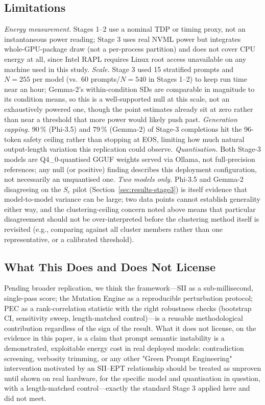 \documentclass[conference]{IEEEtran}
\begin{document}
\subsection{Limitations}
\label{sec:limits}
\emph{Energy measurement.} Stages 1--2 use a nominal TDP or timing
proxy, not an instantaneous power reading; Stage 3 uses real NVML
power but integrates whole-GPU-package draw (not a per-process
partition) and does not cover CPU energy at all, since Intel RAPL
requires Linux root access unavailable on any machine used in this
study. \emph{Scale.} Stage 3 used 15 stratified prompts and $N=255$
per model (vs.\ 60 prompts/$N=540$ in Stages 1--2) to keep run time
near an hour; Gemma-2's within-condition SDs are comparable in
magnitude to its condition means, so this is a well-supported null at
this scale, not an exhaustively powered one, though the point
estimates already sit at zero rather than near a threshold that more
power would likely push past. \emph{Generation capping.} 90\,\%
(Phi-3.5) and 79\,\% (Gemma-2) of Stage-3 completions hit the 96-token
safety ceiling rather than stopping at EOS, limiting how much natural
output-length variation this replication could observe.
\emph{Quantisation.} Both Stage-3 models are Q4\_0-quantised GGUF
weights served via Ollama, not full-precision references; any null (or
positive) finding describes this deployment configuration, not
necessarily an unquantised one. \emph{Two models only.} Phi-3.5 and
Gemma-2 disagreeing on the $S_c$ pilot (Section~\ref{sec:results-stage3})
is itself evidence that model-to-model variance can be large; two
data points cannot establish generality either way, and the
clustering-ceiling concern noted above means that particular
disagreement should not be over-interpreted before the clustering
method itself is revisited (e.g., comparing against all cluster
members rather than one representative, or a calibrated threshold).
\subsection{What This Does and Does Not License}
Pending broader replication, we think the framework---SII as a
sub-millisecond, single-pass score; the Mutation Engine as a
reproducible perturbation protocol; PEC as a rank-correlation
statistic with the right robustness checks (bootstrap CI, sensitivity
sweep, length-matched control)---is a reusable methodological
contribution regardless of the sign of the result. What it does not
license, on the evidence in this paper, is a claim that prompt
semantic instability is a demonstrated, exploitable energy cost in
real deployed models: contradiction screening, verbosity trimming, or
any other "Green Prompt Engineering" intervention motivated by an
SII--EPT relationship should be treated as unproven until shown on
real hardware, for the specific model and quantisation in question,
with a length-matched control---exactly the standard Stage 3 applied
here and did not meet.
\end{document}
